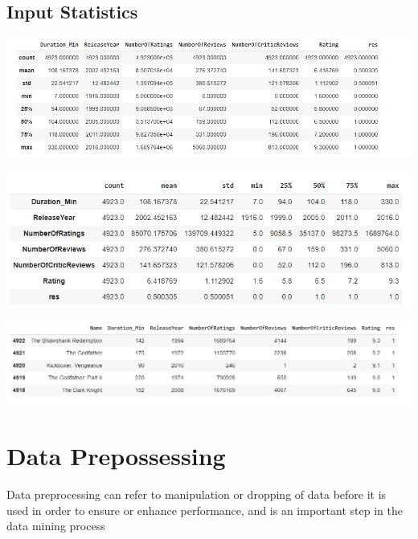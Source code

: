 \documentclass{article}
\begin{document}
\subsection{Input Statistics}
\begin{figure}
\end{figure}
\begin{center}
\includegraphics[scale=0.5]{Count}
\label{figure}
\end{center}
\vspace{10pt}
\begin{figure}
\end{figure}
\begin{center}
\includegraphics[scale=0.5]{Descri}
\label{figure}
\end{center}
\begin{figure}
\end{figure}
\begin{center}
\includegraphics[scale=0.5]{Descri1}
\label{figure}
\end{center}
\section{Data Prepossessing}
Data preprocessing can refer to manipulation or dropping of data before it is used in order to ensure or enhance performance, and is an important step in the data mining process
\begin{figure}
\end{figure}
\end{document}

